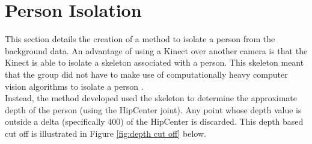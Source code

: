 \section{Person Isolation}
\label{person isolation}
This section details the creation of a method to isolate a person from the background data. An advantage of using a Kinect over another camera is that the Kinect is able to isolate a skeleton associated with a person. This skeleton meant that the group did not have to make use of computationally heavy computer vision algorithms to isolate a person .\\

Instead, the method developed used the skeleton to determine the approximate depth of the person (using the HipCenter joint). Any point whose depth value is outside a delta (specifically 400) of the HipCenter is discarded. This depth based cut off is illustrated in Figure \ref{fig:depth cut off} below.\\

